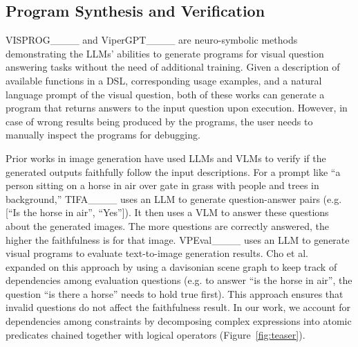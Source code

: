 \subsection{Program Synthesis and Verification}
VISPROG____ and ViperGPT____ are neuro-symbolic methods demonstrating the LLMs' abilities to generate programs for visual question answering tasks without the need of additional training.
Given a description of available functions in a DSL, corresponding usage examples, and a natural language prompt of the visual question, both of these works can generate a program that returns answers to the input question upon execution.
However, in case of wrong results being produced by the programs, the user needs to manually inspect the programs for debugging.

Prior works in image generation have used LLMs and VLMs to verify if the generated outputs faithfully follow the input descriptions.
For a prompt like ``a person sitting on a horse in air over gate in grass with people and trees in background,'' TIFA____ uses an LLM to generate question-answer pairs (e.g. [``Is the horse in air'', ``Yes'']).
It then uses a VLM to answer these questions about the generated images.
The more questions are correctly answered, the higher the faithfulness is for that image. 
VPEval____ uses an LLM to generate visual programs to evaluate text-to-image generation results.
Cho et al.~ expanded on this approach by using a davisonian scene graph to keep track of dependencies among evaluation questions (e.g. to answer ``is the horse in air'', the question ``is there a horse'' needs to hold true first). 
This approach ensures that invalid questions do not affect the faithfulness result. 
In our work, we account for dependencies among constraints by decomposing complex expressions into atomic predicates chained together with logical operators (Figure~\ref{fig:teaser}).


